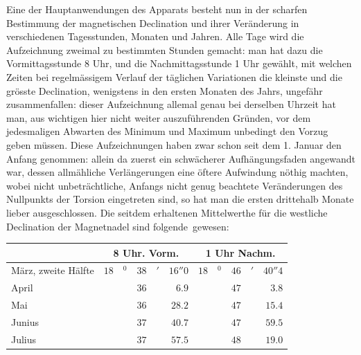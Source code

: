 Eine der Hauptanwendungen des Apparats besteht nun in der scharfen Bestimmung der magnetischen Declination und ihrer Veränderung in verschiedenen Tagesstunden, Monaten und Jahren. Alle Tage wird die Aufzeichnung zweimal zu bestimmten Stunden gemacht: man hat dazu die Vormittagsstunde 8 Uhr, und die Nachmittagsstunde 1 Uhr gewählt, mit welchen Zeiten bei regelmässigem Verlauf der täglichen Variationen die kleinste und die grösste Declination, wenigstens in den ersten Monaten des Jahrs, ungefähr zusammenfallen: dieser Aufzeichnung allemal genau bei derselben Uhrzeit hat man, aus wichtigen hier nicht weiter auszuführenden Gründen, vor dem jedesmaligen Abwarten des Minimum und Maximum unbedingt den Vorzug geben müssen. Diese Aufzeichnungen haben zwar schon seit dem 1. Januar den Anfang genommen: allein da zuerst ein schwächerer Aufhängungsfaden angewandt war, dessen allmähliche Verlängerungen eine öftere Aufwindung nöthig machten, wobei nicht unbeträchtliche, Anfangs nicht genug beachtete Veränderungen des Nullpunkts der Torsion eingetreten sind, so hat man die ersten drittehalb Monate lieber ausgeschlossen. Die seitdem erhaltenen Mittelwerthe für die westliche Declination der Magnetnadel sind \mbox{folgende gewesen:}
\par{}
\par\clearpage
{}
\begin{center}
\begin{tabular}{l|r@{}l@{\enspace}r@{}l@{\enspace}r|r@{}l@{\enspace}r@{}l@{\enspace}r}
 & \multicolumn{5}{c|}{8 Uhr. Vorm.} & \multicolumn{5}{c}{1 Uhr Nachm.}\\\hline
\rule{0pt}{2.7ex}März, zweite Hälfte & $18$ & ${}^{0}$ & $38$ & ${}'$ & $16''0$ & $18$ & ${}^{0}$ & $46$ & ${}'$ & $40''4$\\
April &  &  & $36$ &  & $6.9$ &  &  & $47$ &  & $3.8$\\
Mai &  &  & $36$ &  & $28.2$ &  &  & $47$ &  & $15.4$\\
Junius &  &  & $37$ &  & $40.7$ &  &  & $47$ &  & $59.5$\\
Julius &  &  & $37$ &  & $57.5$ &  &  & $48$ &  & $19.0$
\end{tabular}
\end{center}

